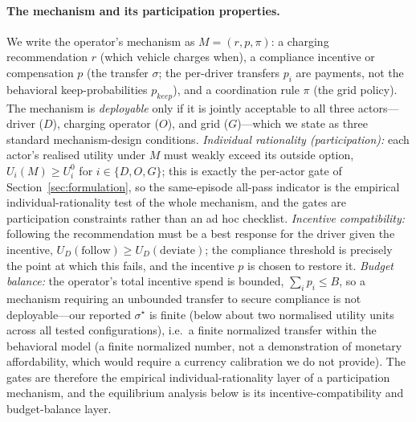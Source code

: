 \documentclass[12pt]{article}
\begin{document}
\paragraph{The mechanism and its participation properties.} We write the operator's mechanism as $M=(r,p,\pi)$: a charging recommendation $r$ (which vehicle charges when), a compliance incentive or compensation $p$ (the transfer $\sigma$; the per-driver transfers $p_i$ are payments, not the behavioral keep-probabilities $p_{keep}$), and a coordination rule $\pi$ (the grid policy). The mechanism is \emph{deployable} only if it is jointly acceptable to all three actors---driver ($D$), charging operator ($O$), and grid ($G$)---which we state as three standard mechanism-design conditions. \emph{Individual rationality (participation):} each actor's realised utility under $M$ must weakly exceed its outside option, $U_i(M)\ge U_i^0$ for $i\in\{D,O,G\}$; this is exactly the per-actor gate of Section~\ref{sec:formulation}, so the same-episode all-pass indicator is the empirical individual-rationality test of the whole mechanism, and the gates are participation constraints rather than an ad hoc checklist. \emph{Incentive compatibility:} following the recommendation must be a best response for the driver given the incentive, $U_D(\text{follow})\ge U_D(\text{deviate})$; the compliance threshold is precisely the point at which this fails, and the incentive $p$ is chosen to restore it. \emph{Budget balance:} the operator's total incentive spend is bounded, $\sum_i p_i\le B$, so a mechanism requiring an unbounded transfer to secure compliance is not deployable---our reported $\sigma^\star$ is finite (below about two normalised utility units across all tested configurations), i.e.\ a finite normalized transfer within the behavioral model (a finite normalized number, not a demonstration of monetary affordability, which would require a currency calibration we do not provide). The gates are therefore the empirical individual-rationality layer of a participation mechanism, and the equilibrium analysis below is its incentive-compatibility and budget-balance layer.
\end{document}
